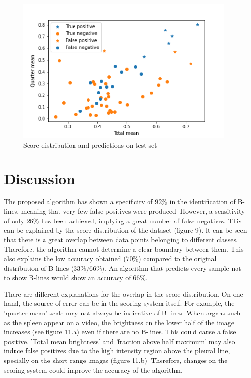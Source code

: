 \documentclass[11pt]{article} %
\begin{document}
	\begin{figure}[h]
	\centering
	\includegraphics[width=11cm]{figuras/discussion.png}
	\caption{Score distribution and predictions on test set}
	\end{figure}	


\section{Discussion}

	The proposed algorithm has shown a specificity of $92 \%$ in the identification of B-lines, meaning that very few false positives were produced. However, a sensitivity of only $26 \%$ has been achieved, implying a great number of false negatives.  This can be explained by the score distribution of the dataset (figure 9). It can be seen that there is a great overlap between data points belonging to different classes. Therefore, the algorithm cannot determine a clear boundary between them. This also explains the low accuracy obtained ($70\%$) compared to the original distribution of B-lines ($ 33\% / 66\%$). An algorithm that predicts every sample not to show B-lines would show an accuracy of $66\%$.
	
	
	There are different explanations for the overlap in the score distribution. On one hand, the source of error can be in the scoring system itself. For example, the 'quarter mean' scale may not always be indicative of B-lines. When organs such as the spleen appear on a video, the brightness on the lower half of the image increases (see figure 11.a) even if there are no B-lines. This could cause a false positive. 'Total mean brightness' and 'fraction above half maximum' may also induce false positives due to the high intensity region above the pleural line, specially on the short range images (figure 11.b). Therefore, changes on the scoring system could improve the accuracy of the algorithm.
	
\end{document}
